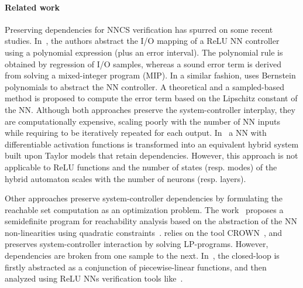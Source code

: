 \documentclass[journal]{IEEEtran}
\begin{document}
\paragraph*{Related work} Preserving dependencies for NNCS verification has spurred on some recent studies. In~\cite{dutta2019reachability}, the authors abstract the I/O mapping of a ReLU NN controller using a polynomial expression (plus an error interval). The polynomial rule is obtained by regression of I/O samples, whereas a sound error term is derived from solving a mixed-integer program (MIP). In a similar fashion, \cite{huang2019reachnn} uses Bernstein polynomials to abstract the NN controller. A theoretical and a sampled-based method is proposed to compute the error term based on the  Lipschitz constant of the NN. Although both approaches preserve the system-controller interplay, they are computationally expensive, scaling poorly with the number of NN inputs while requiring to be iteratively repeated  for each output. In~\cite{ivanov2020verifying}  a NN with differentiable activation functions is transformed into an equivalent hybrid system built upon Taylor models that  retain dependencies. However, this approach is not applicable to ReLU functions and the number of states (resp. modes) of the hybrid automaton scales with the number of neurons (resp. layers).

Other approaches preserve system-controller dependencies by formulating the reachable set computation as an optimization problem. The work~\cite{hu2020reach} proposes a semidefinite program for reachability analysis based on the abstraction of the NN non-linearities using quadratic constraints~\cite{fazlyab2020safety}. \cite{everett2021efficient} relies on the tool  CROWN~\cite{zhang2018efficient}, and preserves system-controller interaction by solving LP-programs. However,  dependencies are broken from one sample to the next. In~\cite{sidrane2022overt}, the closed-loop is firstly abstracted  as a conjunction of piecewise-linear functions, and then analyzed using ReLU NNs verification tools like~\cite{tjeng2017evaluating,katz2017reluplex}.
\end{document}
